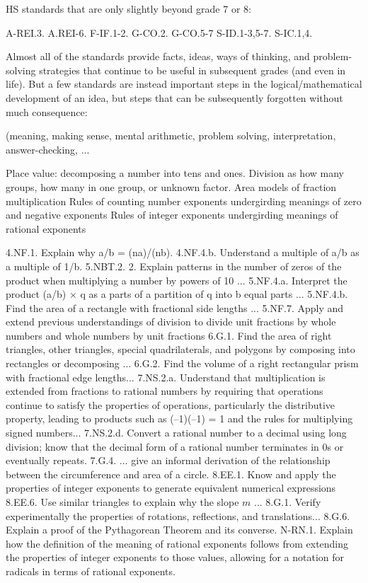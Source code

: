 HS standards that are only slightly beyond grade 7 or 8: 

A-REI.3. 
A.REI-6. 
F-IF.1-2. 
G-CO.2.
G-CO.5-7
S-ID.1-3,5-7. 
S-IC.1,4. 


Almost all of the standards provide facts, ideas, ways of thinking, and problem-solving strategies that continue to be useful in subsequent grades 
(and even in life).  But a few standards are instead important steps in the logical/mathematical development of an idea, but steps that can be subsequently forgotten without much consequence:  

(meaning, making sense, mental arithmetic, problem solving, interpretation, answer-checking, ...

Place value: decomposing a number into tens and ones.  
Division as how many groups, how many in one group, or unknown factor. 
Area models of fraction multiplication
Rules of counting number exponents undergirding meanings of zero and negative exponents
Rules of integer exponents undergirding meanings of rational exponents

4.NF.1.  Explain why a/b = (na)/(nb).  
4.NF.4.b.  Understand a multiple of a/b as a multiple of 1/b. 
5.NBT.2. 2. Explain patterns in the number of zeros of the product when multiplying a number by powers of 10 ...
5.NF.4.a.  Interpret the product (a/b) × q as a parts of a partition of q into b equal parts ...
5.NF.4.b. Find the area of a rectangle with fractional side lengths ...
5.NF.7. Apply and extend previous understandings of division to divide unit fractions by whole numbers and whole numbers by unit fractions
6.G.1.  Find the area of right triangles, other triangles, special quadrilaterals, and polygons by composing into rectangles or decomposing ...
6.G.2.  Find the volume of a right rectangular prism with fractional edge lengths...
7.NS.2.a.  Understand that multiplication is extended from fractions to rational numbers by requiring that operations continue to
satisfy the properties of operations, particularly the distributive property, leading to products such as (–1)(–1) = 1 and the rules
for multiplying signed numbers...
7.NS.2.d. Convert a rational number to a decimal using long division; know that the decimal form of a rational number terminates in 0s or eventually repeats.  
7.G.4.  ... give an informal derivation of the relationship between the circumference and area of a circle.
8.EE.1. Know and apply the properties of integer exponents to generate equivalent numerical expressions
8.EE.6. Use similar triangles to explain why the slope $m$ ...
8.G.1. Verify experimentally the properties of rotations, reflections, and translations...
8.G.6. Explain a proof of the Pythagorean Theorem and its converse.
N-RN.1. Explain how the definition of the meaning of rational exponents follows from extending the properties of integer exponents to those values, allowing for a notation for radicals in terms of rational exponents.


